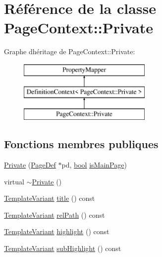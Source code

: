\hypertarget{class_page_context_1_1_private}{}\section{Référence de la classe Page\+Context\+:\+:Private}
\label{class_page_context_1_1_private}
Graphe d\textquotesingle{}héritage de Page\+Context\+:\+:Private\+:\begin{figure}[H]
\begin{center}
\leavevmode
\includegraphics[height=3.000000cm]{class_page_context_1_1_private}
\end{center}
\end{figure}
\subsection*{Fonctions membres publiques}
\begin{DoxyCompactItemize}
\item 
\hyperlink{class_page_context_1_1_private_ad258d1de01d10406f1e76f7d8f90999e}{Private} (\hyperlink{class_page_def}{Page\+Def} $\ast$pd, \hyperlink{qglobal_8h_a1062901a7428fdd9c7f180f5e01ea056}{bool} \hyperlink{index_8h_aec03800047ada46460eb75113cfee322ad124df548e4254793c5f5d59fcc31484}{is\+Main\+Page})
\item 
virtual \hyperlink{class_page_context_1_1_private_a2779a942f1a15bd11f07a2235c7248d8}{$\sim$\+Private} ()
\item 
\hyperlink{class_template_variant}{Template\+Variant} \hyperlink{class_page_context_1_1_private_a468e9fb746be348189b6f147ad824535}{title} () const 
\item 
\hyperlink{class_template_variant}{Template\+Variant} \hyperlink{class_page_context_1_1_private_a2263faa39ae947a1b3c9e788d7dad22d}{rel\+Path} () const 
\item 
\hyperlink{class_template_variant}{Template\+Variant} \hyperlink{class_page_context_1_1_private_a36387ba93f2331b99d200981b95101a4}{highlight} () const 
\item 
\hyperlink{class_template_variant}{Template\+Variant} \hyperlink{class_page_context_1_1_private_a9af428f33ded3fe5de20da3f2ead98eb}{sub\+Highlight} () const 
\end{DoxyCompactItemize}


